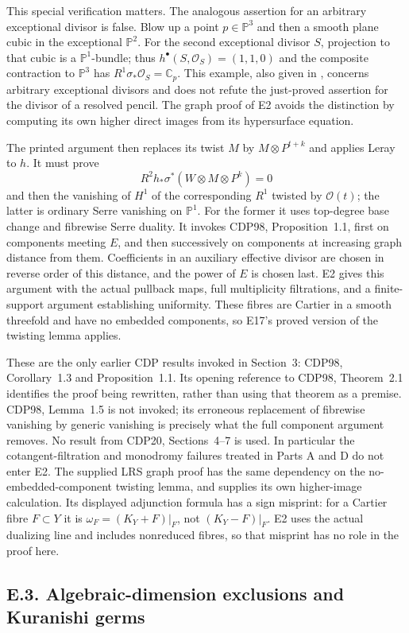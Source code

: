 This special verification matters. The analogous assertion for
an arbitrary exceptional divisor is false. Blow up a point
$p\in\mathbb P^3$ and then a smooth plane cubic in the exceptional
$\mathbb P^2$. For the second exceptional divisor $S$, projection
to that cubic is a $\mathbb P^1$-bundle; thus
$h^\bullet(S,\mathcal O_S)=(1,1,0)$ and the composite contraction
to $\mathbb P^3$ has
$R^1\sigma_*\mathcal O_S=\mathbb C_p$.
This example, also given in \cite{LRS2019}, concerns arbitrary
exceptional divisors and does not refute the just-proved assertion
for the divisor of a resolved pencil. The graph proof of E2
avoids the distinction by computing its own higher direct images
from its hypersurface equation.

The printed argument then replaces its twist $M$ by
$M\otimes P^{t+k}$ and applies Leray to $h$. It must prove
\[
 R^2h_*\sigma^*(W\otimes M\otimes P^k)=0
\]
and then the vanishing of $H^1$ of the corresponding $R^1$
twisted by $\mathcal O(t)$; the latter is ordinary Serre
vanishing on $\mathbb P^1$. For the former it uses top-degree
base change and fibrewise Serre duality. It invokes CDP98,
Proposition~1.1, first on components meeting $E$, and then
successively on components at increasing graph distance from
them. Coefficients in an auxiliary effective divisor are chosen
in reverse order of this distance, and the power of $E$ is
chosen last. E2 gives this argument with the actual pullback
maps, full multiplicity filtrations, and a finite-support
argument establishing uniformity. These fibres are Cartier in
a smooth threefold and have no embedded components, so E17's
proved version of the twisting lemma applies.

These are the only earlier CDP results invoked in Section~3:
CDP98, Corollary~1.3 and Proposition~1.1. Its opening reference
to CDP98, Theorem~2.1 identifies the proof being rewritten,
rather than using that theorem as a premise. CDP98, Lemma~1.5
is not invoked; its erroneous replacement of fibrewise vanishing
by generic vanishing is precisely what the full component
argument removes. No result from CDP20, Sections~4--7 is used.
In particular the cotangent-filtration and monodromy failures
treated in Parts A and D do not enter E2. The supplied LRS
graph proof has the same dependency on the no-embedded-component
twisting lemma, and supplies its own higher-image calculation.
Its displayed adjunction formula has a sign misprint:
for a Cartier fibre $F\subset Y$ it is
$\omega_F=(K_Y+F)|_F$, not $(K_Y-F)|_F$.
E2 uses the actual dualizing line and includes nonreduced fibres,
so that misprint has no role in the proof here.


\subsection{E.3. Algebraic-dimension exclusions and Kuranishi germs}


